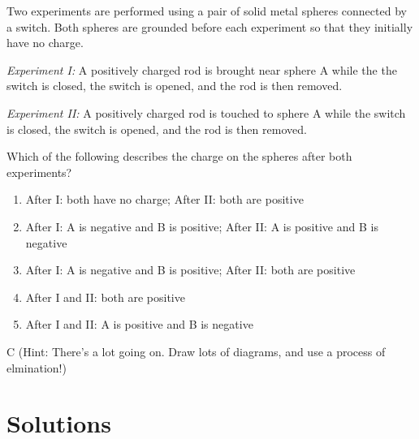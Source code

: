 \newpage
\begin{question}
Two experiments are performed using a pair of solid metal spheres connected by a switch. Both spheres are grounded before each experiment so that they initially have no charge.

\emph{Experiment I:} A positively charged rod is brought near sphere A while the the switch is closed, the switch is opened, and the rod is then removed.

\emph{Experiment II:} A positively charged rod is touched to sphere A while the switch is closed, the switch is opened, and the rod is then removed.

Which of the following describes the charge on the spheres after both experiments?
\begin{enumerate}[label=(\alph*)]
    \item After I: both have no charge; After II: both are positive
    \item After I: A is negative and B is positive; After II: A is positive and B is negative
    \item After I: A is negative and B is positive; After II: both are positive
    \item After I and II: both are positive
    \item After I and II: A is positive and B is negative
\end{enumerate}

\end{question}

\begin{solution}
C (Hint: There's a lot going on. Draw lots of diagrams, and use a process of elmination!)
\end{solution}


\newpage
\section{Solutions}


\printsolutions